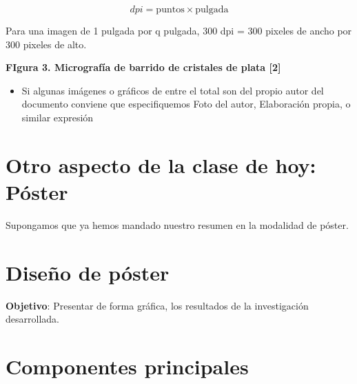\documentclass{article}
\begin{document}
\[ dpi = \text{puntos} \times  \text{pulgada}\] \vspace{0.5cm}

Para una imagen de 1 pulgada por q pulgada, 300 dpi = 300 pixeles de ancho por 300 pixeles de alto.



\textbf{FIgura 3. Micrografía de barrido de cristales de plata [2]} \vspace{0.5cm}


\begin{itemize}
	\item Si algunas imágenes o gráficos de entre el total son del propio autor del documento conviene que especifiquemos Foto del autor, Elaboración propia, o similar expresión
\end{itemize} \vspace{0.5cm}

\section{ Otro aspecto de la clase de hoy: Póster} \vspace{0.5cm}


Supongamos que ya hemos mandado nuestro resumen en la modalidad de póster.  \vspace{0.5cm}

\section{Diseño de póster} \vspace{0.5cm} 


\textbf{Objetivo}: Presentar de forma gráfica, los resultados de la investigación desarrollada. 



\section{\textcolor{Cinnabar}{Componentes principales}} \vspace{0.5cm}
\end{document}
